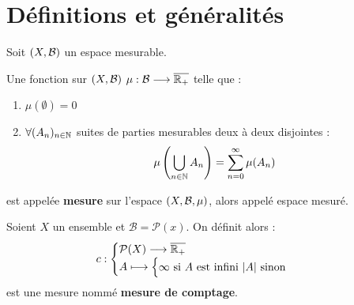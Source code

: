 \minitoc  %


\section{Définitions et généralités}

Soit $(X, \mathcal{B})$ un espace mesurable.

\begin{definition}[Mesure]
    Une fonction sur $(X, \mathcal{B})$ $ \mu : \mathcal{B} \longrightarrow \overline{\mathbb{R}_+} $ telle que :
    \begin{enumerate}
        \item $\mu (\emptyset) = 0 $
        \item $ \forall (A_n)_{n\in\mathbb{N}}$ suites de parties mesurables deux à deux disjointes :
            \[ \mu \left( \bigcup_{n\in\mathbb{N}} A_n \right) = \sum_{n=0}^{\infty} \mu (A_n) \]
    \end{enumerate}
    est appelée \textbf{mesure} sur l'espace $(X,\mathcal{B},\mu)$, alors appelé espace mesuré.
\end{definition}

\begin{example}
    Soient $X$ un ensemble et $\mathcal{B} = \mathcal{P}(x)$. On définit alors :
        \[ c :
            \begin{cases}
                \mathcal{P}(X) \longrightarrow \overline{\mathbb{R}_+} \\
                A \longmapsto \begin{cases}
                                    \infty \text{ si } A \text{ est infini }
                                    |A| \text{ sinon }
                                \end{cases}
            \end{cases}
        \] 
    est une mesure nommé \textbf{mesure de comptage}.
\end{example}

